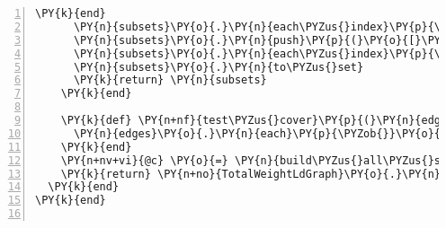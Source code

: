 \begin{Verbatim}[commandchars=\\\{\},numbers=left,firstnumber=1,stepnumber=1,xleftmargin=7mm, fontsize=\small]
      \PY{k}{end}
      \PY{n}{subsets}\PY{o}{.}\PY{n}{each\PYZus{}index}\PY{p}{\PYZob{}}\PY{o}{|}\PY{n}{k}\PY{o}{|} \PY{k}{if} \PY{n}{k}\PY{o}{>}\PY{l+m+mi}{1} \PY{k}{then} \PY{n}{subsets}\PY{o}{[}\PY{n}{k}\PY{o}{]}\PY{o}{.}\PY{n}{push}\PY{p}{(}\PY{n+nv+vi}{@id}\PY{p}{)} \PY{k}{end}\PY{p}{\PYZcb{}}
      \PY{n}{subsets}\PY{o}{.}\PY{n}{push}\PY{p}{(}\PY{o}{[}\PY{n+nv+vi}{@id}\PY{o}{]}\PY{p}{)}
      \PY{n}{subsets}\PY{o}{.}\PY{n}{each\PYZus{}index}\PY{p}{\PYZob{}}\PY{o}{|}\PY{n}{k}\PY{o}{|} \PY{n}{subsets}\PY{o}{[}\PY{n}{k}\PY{o}{]} \PY{o}{=} \PY{n}{subsets}\PY{o}{[}\PY{n}{k}\PY{o}{]}\PY{o}{.}\PY{n}{to\PYZus{}set}\PY{p}{\PYZcb{}}
      \PY{n}{subsets}\PY{o}{.}\PY{n}{to\PYZus{}set}
      \PY{k}{return} \PY{n}{subsets}
    \PY{k}{end}

    \PY{k}{def} \PY{n+nf}{test\PYZus{}cover}\PY{p}{(}\PY{n}{edges}\PY{p}{,} \PY{n}{cover}\PY{p}{)}
      \PY{n}{edges}\PY{o}{.}\PY{n}{each}\PY{p}{\PYZob{}}\PY{o}{|}\PY{n}{k}\PY{o}{|} \PY{k}{return} \PY{k+kp}{false} \PY{k}{if} \PY{n}{cover}\PY{o}{-}\PY{n}{k} \PY{o}{==} \PY{n}{cover}\PY{p}{\PYZcb{}} 
    \PY{k}{end}
    \PY{n+nv+vi}{@c} \PY{o}{=} \PY{n}{build\PYZus{}all\PYZus{}subsets}\PY{o}{.}\PY{n}{select}\PY{p}{\PYZob{}}\PY{o}{|}\PY{n}{k}\PY{o}{|} \PY{n}{test\PYZus{}cover}\PY{p}{(}\PY{n}{alledges}\PY{p}{,} \PY{n}{k}\PY{p}{)}\PY{p}{\PYZcb{}}\PY{o}{.}\PY{n}{to\PYZus{}set}
    \PY{k}{return} \PY{n+no}{TotalWeightLdGraph}\PY{o}{.}\PY{n}{new}\PY{p}{(}\PY{n+nv+vi}{@c}\PY{p}{,} \PY{n}{nodes}\PY{p}{)}
  \PY{k}{end}  
\PY{k}{end}


\end{Verbatim}
